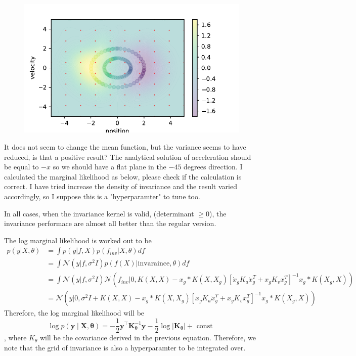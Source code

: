 \documentclass{article}
\begin{document}
\begin{figure}[H]
  \includegraphics[width=\linewidth]{posterior_invariance_contour.pdf}
  \centering
\end{figure}

It does not seem to change the mean function, but the variance seems to have reduced, is that a positive result?
The analytical solution of acceleration should be equal to $-x$ so we should have a flat plane in the $-45$ degrees direction. 
I calculated the marginal likelihood as below, please check if the calculation is correct. 
I have tried increase the density of invariance and the result varied accordingly, so I suppose this is a "hyperparamter" to tune too.

In all cases, when the invariance kernel is valid, (determinant $\ge0$), the invariance performace are almost all better than the regular version.

The log marginal likelihood is worked out to be 
$$
\begin{aligned}
p(y|X,\theta) &= \int p(y|f, X)p(f_{inv}|X, \theta)df\\ &= \int \mathcal{N}(y|f, \sigma^2I)p(f(X)|\text{invaraince}, \theta)df\\ &= \int \mathcal{N}(y|f, \sigma^2I)\mathcal{N}(f_{inv}|0,K(X, X)-x_g*K(X, X_g)[\dot{x}_gK_a\dot{x}_g^T+x_gK_vx_g^T]^{-1}x_g*K(X_g, X))\\
&=\mathcal{N}(y|0, \sigma^2I+K(X, X)-x_g*K(X, X_g)[\dot{x}_gK_a\dot{x}_g^T+x_gK_vx_g^T]^{-1}x_g*K(X_g, X))
\end{aligned}
$$
Therefore, the log marginal likelihood will be
$$
\log p(\boldsymbol{y} \mid \boldsymbol{X}, \boldsymbol{\theta})=-\frac{1}{2} \boldsymbol{y}^{\top} \boldsymbol{K}_{\boldsymbol{\theta}}^{-1} \boldsymbol{y}-\frac{1}{2} \log \left|\boldsymbol{K}_{\boldsymbol{\theta}}\right|+\text { const }
$$, where $K_\theta$ will be the covariance derived in the previous equation.
Therefore, we note that the grid of invariance is also a hyperparamter to be integrated over.
\end{document}
